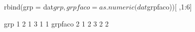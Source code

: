 \begin{Schunk}
\begin{Sinput}
  rbind(grp = dat$grp, grpfaco = as.numeric(dat$grpfaco))[ ,1:6]
\end{Sinput}
\begin{Soutput}
        [,1] [,2] [,3] [,4] [,5] [,6]
grp        1    2    1    3    1    1
grpfaco    2    1    2    3    2    2
\end{Soutput}
\end{Schunk}

